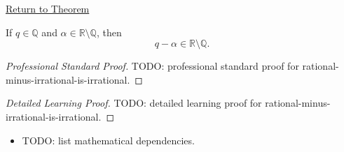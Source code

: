 \newpage
{}
\label{prf:rational-minus-irrational-is-irrational}

\begin{remark*}[Return]
\hyperref[thm:rational-minus-irrational-is-irrational]{Return to Theorem}
\end{remark*}

\begin{theorem*}
If $q\in\mathbb{Q}$ and $\alpha\in\mathbb{R}\setminus\mathbb{Q}$, then
\[
q-\alpha\in\mathbb{R}\setminus\mathbb{Q}.
\]
\end{theorem*}

\begin{proof}[Professional Standard Proof]
\LRAProofBodyStart
TODO: professional standard proof for rational-minus-irrational-is-irrational.
\end{proof}

\begin{proof}[Detailed Learning Proof]
\LRAProofBodyStart
TODO: detailed learning proof for rational-minus-irrational-is-irrational.
\end{proof}

\begin{remark*}
\end{remark*}

\begin{dependencies}
\begin{itemize}
  \item TODO: list mathematical dependencies.
\end{itemize}
\end{dependencies}

\clearpage
